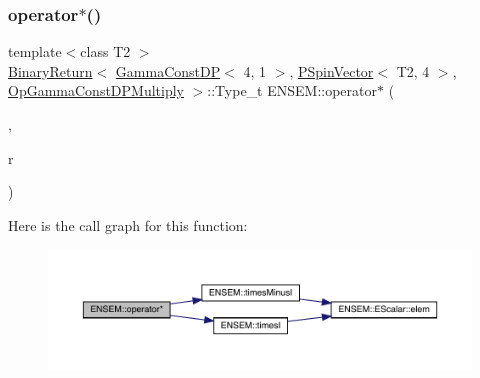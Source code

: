 \mbox{\label{group__primspinvector_gaed649bcddaa4c48fdd28113f712d2ab7}} 
\subsubsection{\texorpdfstring{operator$\ast$()}{operator*()}\hspace{0.1cm}{\footnotesize\ttfamily [18/32]}}
{\footnotesize\ttfamily template$<$class T2 $>$ \\
\mbox{\hyperlink{structENSEM_1_1BinaryReturn}{Binary\+Return}}$<$ \mbox{\hyperlink{classENSEM_1_1GammaConstDP}{Gamma\+Const\+DP}}$<$ 4, 1 $>$, \mbox{\hyperlink{classENSEM_1_1PSpinVector}{P\+Spin\+Vector}}$<$ T2, 4 $>$, \mbox{\hyperlink{structENSEM_1_1OpGammaConstDPMultiply}{Op\+Gamma\+Const\+D\+P\+Multiply}} $>$\+::Type\+\_\+t E\+N\+S\+E\+M\+::operator$\ast$ (\begin{DoxyParamCaption}\item[{const \mbox{\hyperlink{classENSEM_1_1GammaConstDP}{Gamma\+Const\+DP}}$<$ 4, 1 $>$ \&}]{,  }\item[{const \mbox{\hyperlink{classENSEM_1_1PSpinVector}{P\+Spin\+Vector}}$<$ T2, 4 $>$ \&}]{r }\end{DoxyParamCaption})\hspace{0.3cm}{\ttfamily [inline]}}

Here is the call graph for this function\+:\nopagebreak
\begin{figure}[H]
\begin{center}
\leavevmode
\includegraphics[width=350pt]{dd/d6d/group__primspinvector_gaed649bcddaa4c48fdd28113f712d2ab7_cgraph}
\end{center}
\end{figure}
\mbox{\label{group__primspinvector_gad71a48b8030b0f439b6c45ff4c5d550b}} 

